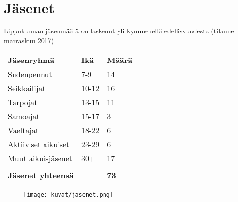 \section{Jäsenet}
Lippukunnan jäsenmäärä on laskenut yli kymmenellä edellisvuodesta (tilanne marraskuu 2017)\\
\begin{center}
\begin{tabular}{ l l l }
	\textbf{Jäsenryhmä} & \textbf{Ikä} & \textbf{Määrä}\\
	Sudenpennut & 7-9 & 14\\
	Seikkailijat & 10-12 & 16\\
	Tarpojat & 13-15 & 11\\
	Samoajat & 15-17 & 3\\
	Vaeltajat & 18-22 & 6\\
	Aktiiviset aikuiset & 23-29 & 6\\
	Muut aikuisjäsenet & 30+ & 17\\
				   & & \\
	\textbf{Jäsenet yhteensä} & & \textbf{73}
\end{tabular}
\begin{figure}[htb]
	\begin{center}
		\texttt{[image: kuvat/jasenet.png]}
	\end{center}
\end{figure}


\end{center}
